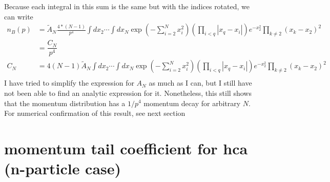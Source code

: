 \documentclass[onecolumn,english,aps,pra]{revtex4}
\begin{document}
Because each integral in this sum is the same but with the indices rotated, we can write
\begin{align*}
n_{B}(p) & = \tilde{A}_{N} \frac{4 * (N - 1)}{p^4} \int dx_{2} \cdots \int dx_{N} 
	\exp\left(- \sum_{i = 2}^{N} x_{i}^2\right) \left( \prod_{ i < q} |x_{q} - x_{i}| \right) 
	e^{-x_{2}^2} \prod_{k \neq 2} (x_{k} - x_{2})^2\\
	& = \dfrac{C_{N}}{p^4}\\
C_{N} & = 4(N - 1)\tilde{A}_{N}  \int dx_{2} \cdots \int dx_{N} 
	\exp\left(- \sum_{i = 2}^{N} x_{i}^2\right) \left( \prod_{ i < q} |x_{q} - x_{i}| \right) 
	e^{-x_{2}^2} \prod_{k \neq 2} (x_{k} - x_{2})^2\\
\end{align*}
I have tried to simplify the expression for $A_{N}$ as much as I can, but I still have not been able to find an analytic expression for it. Nonetheless, this still shows that the momentum distribution has a $1/p^4$ momentum decay for arbitrary $N$. For numerical confirmation of this result, see next section

\section{momentum tail coefficient for hca (n-particle case)}


	
\end{document}
